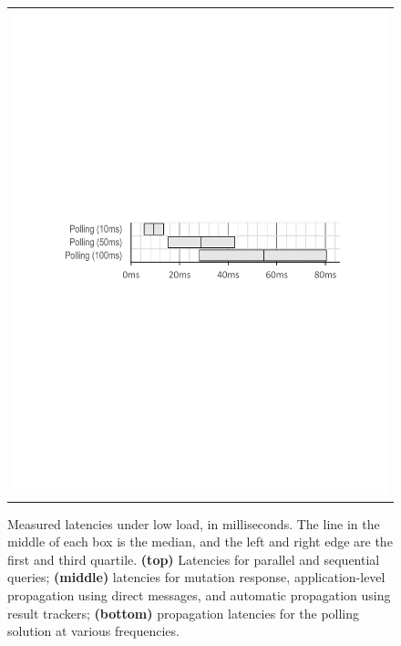 \begin{figure}
\begin{tabular}{@{}c@{}}
\includegraphics[width=\columnwidth, viewport=85 354 534 444]{figs/polling-latencies}\\
\end{tabular}
\caption{Measured latencies under low load, in milliseconds. The line in the middle of each box is the median, and the left and right edge are the first and third quartile. \textbf{(top)} Latencies for parallel and sequential queries; \textbf{(middle)} latencies for mutation response, application-level propagation using direct messages, and automatic propagation using result trackers; \textbf{(bottom)} propagation latencies for the polling solution at various frequencies.}\label{fig:querylatencies}
\end{figure}

